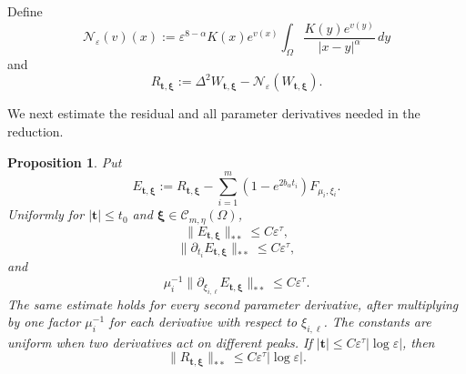 \documentclass[11pt]{article}
\newtheorem{proposition}[theorem]{Proposition}
\numberwithin{equation}{section}
\begin{document}
Define
\begin{equation*}
\mathcal N_\varepsilon(v)(x)
:=\varepsilon^{8-\alpha}K(x)e^{v(x)}
\int_\Omega\frac{K(y)e^{v(y)}}{|x-y|^\alpha}\,dy
\end{equation*}
and
\begin{equation*}
R_{\boldsymbol t,\boldsymbol\xi}
:=\Delta^2W_{\boldsymbol t,\boldsymbol\xi}
-\mathcal N_\varepsilon(W_{\boldsymbol t,\boldsymbol\xi}).
\end{equation*}

We next estimate the residual and all parameter derivatives needed in the reduction.

\begin{proposition}\label{prop:residual}
Put
\[
E_{\boldsymbol t,\boldsymbol\xi}
:=R_{\boldsymbol t,\boldsymbol\xi}
-\sum_{i=1}^{m}(1-e^{2b_\alpha t_i})F_{\mu_i,\xi_i}.
\]
Uniformly for $|\boldsymbol t|\leq t_0$ and
$\boldsymbol\xi\in\mathcal C_{m,\eta}(\Omega)$,
\begin{equation}\label{eq:residual-estimate}
\|E_{\boldsymbol t,\boldsymbol\xi}\|_{**}\leq C\varepsilon^\tau,
\end{equation}
\begin{equation}\label{eq:residual-t-derivative}
\|\partial_{t_i}E_{\boldsymbol t,\boldsymbol\xi}\|_{**}
\leq C\varepsilon^\tau,
\end{equation}
and
\begin{equation}\label{eq:residual-xi-derivative}
\mu_i^{-1}\|\partial_{\xi_{i,\ell}}E_{\boldsymbol t,\boldsymbol\xi}\|_{**}
\leq C\varepsilon^\tau.
\end{equation}
The same estimate holds for every second parameter derivative, after
multiplying by one factor $\mu_i^{-1}$ for each derivative with
respect to $\xi_{i,\ell}$. The constants are uniform when two
derivatives act on different peaks. If
$|\boldsymbol t|\leq C\varepsilon^\tau|\log\varepsilon|$, then
\begin{equation}\label{eq:residual-small}
\|R_{\boldsymbol t,\boldsymbol\xi}\|_{**}
\leq C\varepsilon^\tau|\log\varepsilon|.
\end{equation}
\end{proposition}
\end{document}
